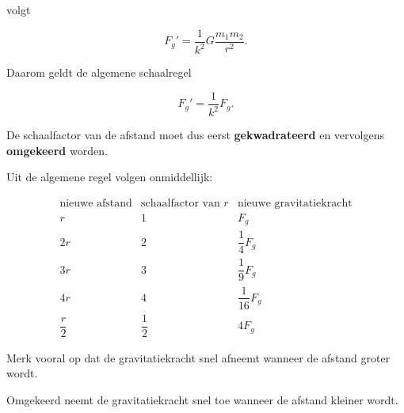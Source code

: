 \documentclass{ximera}
\begin{document}
volgt

\[
F_g'
=
\frac{1}{k^2}
G\frac{m_1m_2}{r^2}.
\]

Daarom geldt de algemene schaalregel

\[
\boxed{
F_g'=\frac{1}{k^2}F_g.
}
\]

De schaalfactor van de afstand moet dus eerst
\textbf{gekwadrateerd} en vervolgens \textbf{omgekeerd} worden.



Uit de algemene regel volgen onmiddellijk:

\[
\begin{array}{c|c|c}
\text{nieuwe afstand}
&
\text{schaalfactor van }r
&
\text{nieuwe gravitatiekracht}
\\
\hline
r       & 1             & F_g \\[2mm]
2r      & 2             & \dfrac14F_g \\[2mm]
3r      & 3             & \dfrac19F_g \\[2mm]
4r      & 4             & \dfrac1{16}F_g \\[2mm]
\dfrac r2 & \dfrac12    & 4F_g
\end{array}
\]

Merk vooral op dat de gravitatiekracht snel afneemt wanneer de
afstand groter wordt.

Omgekeerd neemt de gravitatiekracht snel toe wanneer de afstand
kleiner wordt.
\end{document}
